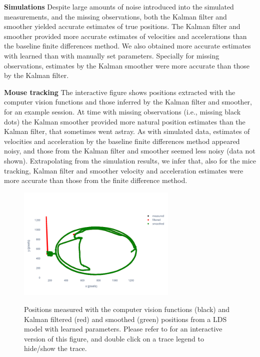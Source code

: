 
\noindent\textbf{Simulations}
%
Despite large amounts of noise introduced into the simulated measurements, and
the missing observations, both the Kalman filter and smoother yielded accurate
estimates of true positions.
%
The Kalman filter and smoother provided more accurate estimates of velocities
and accelerations than the baseline finite differences method.
%
We also obtained more accurate estimates with learned than with manually set
parameters.
%
Specially for missing observations, estimates by the Kalman smoother were more
accurate than those by the Kalman filter.

\noindent\textbf{Mouse tracking}
%
The interactive figure shows positions extracted with the computer vision
functions and those inferred by the Kalman filter and smoother, for an example
session. At time with missing observations (i.e., missing black dots) the
Kalman smoother provided more natural position estimates than the Kalman
filter, that sometimes went astray.
% 
As with simulated data, estimates of velocities and acceleration by the
baseline finite differences method appeared noisy, and those from the Kalman
filter and smoother seemed less noisy (data not shown). Extrapolating from the
simulation results, we infer that, also for the mice tracking, Kalman filter
and smoother velocity and acceleration estimates were more accurate than those
from the finite difference method.

\begin{figure}
    \begin{center}

        \href{http://www.gatsby.ucl.ac.uk/~rapela/fwg/reports/learning/figures/positions_smoothed_session003_start0.00_end15548.27_startPosition0_numPosition10000_pos_learnedParams.html}{\includegraphics[width=3in]{figures/positions_smoothed_session003_start0.00_end15548.27_startPosition0_numPosition10000_pos_learnedParams.png}}

        \caption{Positions measured with the computer vision functions (black)
        and Kalman filtered (red) and smoothed (green) positions from a LDS
        model with learned parameters. Please refer to \cite{c3} for an
        interactive version of this figure, and double click on a trace legend
        to hide/show the trace.}

    \end{center}
\end{figure}

